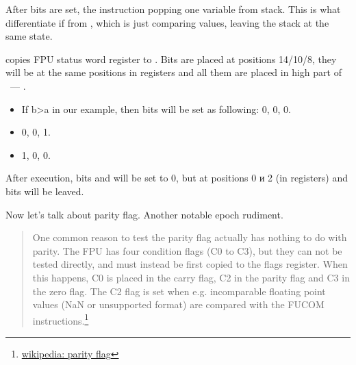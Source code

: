 {After bits are set, the \FCOMP instruction popping one variable from stack. 
This is what differentiate if from \FCOM, which is just comparing values, leaving the stack at the same state.}

{\FNSTSW copies FPU status word register to \AX. Bits \CThreeBits are placed at positions 14/10/8, 
they will be at the same positions in \AX registers and all them are placed in high part of \AX ~--- \AH.}

\begin{itemize}
\item
{}
{If b>a in our example, then \CThreeBits bits will be set as following:} 0, 0, 0.
\item
{} 0, 0, 1.
\item
{} 1, 0, 0.
\end{itemize}

{After  execution, bits \Cthree and  will be set to 0, 
but at positions 0 и 2 (in \AH registers) 
\Czero and \Ctwo bits will be leaved.}

{Now let's talk about parity flag. Another notable epoch rudiment.}

\begin{framed}
\begin{quotation}
One common reason to test the parity flag actually has nothing to do with parity. The FPU has four condition flags 
(C0 to C3), but they can not be tested directly, and must instead be first copied to the flags register. 
When this happens, C0 is placed in the carry flag, C2 in the parity flag and C3 in the zero flag. 
The C2 flag is set when e.g. incomparable floating point values (NaN or unsupported format) are compared 
with the FUCOM instructions.\footnote{\href{http://en.wikipedia.org/wiki/Parity_flag}{wikipedia: parity flag}}
\end{quotation}
\end{framed}

